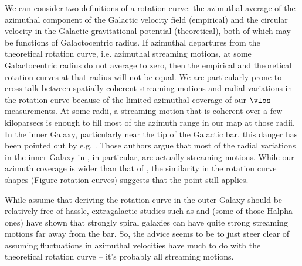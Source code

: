 We can consider two definitions of a rotation curve: the azimuthal average of the azimuthal component of the Galactic velocity field (empirical) and the circular velocity in the Galactic gravitational potential (theoretical), both of which may be functions of Galactocentric radius. 
If azimuthal departures from the theoretical rotation curve, i.e. azimuthal streaming motions, at some Galactocentric radius do not average to zero, then the empirical and theoretical rotation curves at that radius will not be equal. 
We are particularly prone to cross-talk between spatially coherent streaming motions and radial variations in the rotation curve because of the limited azimuthal coverage of our $\vlos$ measurements.
At some radii, a streaming motion that is coherent over a few kiloparsecs is enough to fill most of the azimuth range in our map at those radii. 
In the inner Galaxy, particularly near the tip of the Galactic bar, this danger has been pointed out by e.g. \citet{Chemin_2015}.
Those authors argue that most of the radial variations in the inner Galaxy in \Clemens, in particular, are actually streaming motions.
While our azimuth coverage is wider than that of \Clemens, the similarity in the rotation curve shapes (Figure rotation curves) suggests that the point still applies.

While \citet{Chemin_2015} assume that deriving the rotation curve in the outer Galaxy should be relatively free of hassle, extragalactic studies such as \citet{Meidt_2013} and (some of those Halpha ones) have shown that strongly spiral galaxies can have quite strong streaming motions far away from the bar. 
So, the advice seems to be to just steer clear of assuming fluctuations in azimuthal velocities have much to do with the theoretical rotation curve -- it's probably all streaming motions. 
